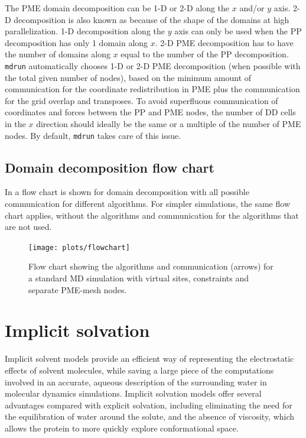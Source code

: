The PME domain decomposition can be 1-D or 2-D along the $x$ and/or
$y$ axis. 2-D decomposition is also known as  because of
the shape of the domains at high parallelization.
1-D decomposition along the $y$ axis can only be used when
the PP decomposition has only 1 domain along $x$. 2-D PME decomposition
has to have the number of domains along $x$ equal to the number of
the PP decomposition. {\tt mdrun} automatically chooses 1-D or 2-D
PME decomposition (when possible with the total given number of nodes),
based on the minimum amount of communication for the coordinate redistribution
in PME plus the communication for the grid overlap and transposes.
To avoid superfluous communication of coordinates and forces
between the PP and PME nodes, the number of DD cells in the $x$
direction should ideally be the same or a multiple of the number
of PME nodes. By default, {\tt mdrun} takes care of this issue.

\subsection{Domain decomposition flow chart}
In  a flow chart is shown for domain decomposition
with all possible communication for different algorithms.
For simpler simulations, the same flow chart applies,
without the algorithms and communication for
the algorithms that are not used.

\begin{figure}
\centerline{\texttt{[image: plots/flowchart]}}
\caption{
Flow chart showing the algorithms and communication (arrows)
for a standard MD simulation with virtual sites, constraints
and separate PME-mesh nodes.
\label{fig:dd_flow}
}
\end{figure}


\section{Implicit solvation}
\label{sec:gbsa}
Implicit solvent models provide an efficient way of representing 
the electrostatic effects of solvent molecules, while saving a 
large piece of the computations involved in an accurate, aqueous 
description of the surrounding water in molecular dynamics simulations. 
Implicit solvation models offer several advantages compared with 
explicit solvation, including eliminating the need for the equilibration of water 
around the solute, and the absence of viscosity, which allows the protein 
to more quickly explore conformational space.

